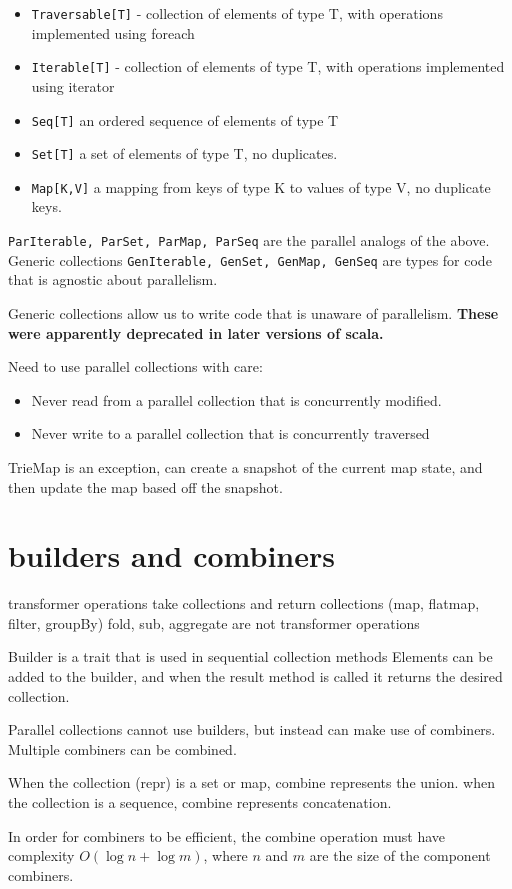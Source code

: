 \begin{itemize}
    \item \lstinline|Traversable[T]| - collection of elements of type T, with operations implemented using foreach
    \item \lstinline|Iterable[T]| - collection of elements of type T, with operations implemented using iterator
    \item \lstinline|Seq[T]| an ordered sequence of elements of type T
    \item \lstinline|Set[T]| a set of elements of type T, no duplicates.
    \item \lstinline|Map[K,V]| a mapping from keys of type K to values of type V, no duplicate keys.
\end{itemize}

\lstinline|ParIterable, ParSet, ParMap, ParSeq| are the parallel analogs of the above.
Generic collections \lstinline|GenIterable, GenSet, GenMap, GenSeq| are types for code that is agnostic about parallelism.

Generic collections allow us to write code that is unaware of parallelism. {\bf These were apparently deprecated in later versions of scala.}

Need to use parallel collections with care:
\begin{itemize}
    \item Never read from a parallel collection that is concurrently modified.
    \item Never write to a parallel collection that is concurrently traversed
\end{itemize}
TrieMap is an exception, can create a snapshot of the current map state, and then update the map based off the snapshot.

\section{ builders and combiners}
transformer operations take collections and return collections (map, flatmap, filter, groupBy)
fold, sub, aggregate are not transformer operations

Builder is a trait that is used in sequential collection methods
Elements can be added to the builder, and when the result method is called it returns the desired collection.

Parallel collections cannot use builders, but instead can make use of combiners. Multiple combiners can be combined.

When the collection (repr) is a set or map, combine represents the union.
when the collection is a sequence, combine represents concatenation.

In order for combiners to be efficient, the combine operation must have complexity $O( \log n + \log m)$, where $n$ and $m$ are the size of the component combiners. 




